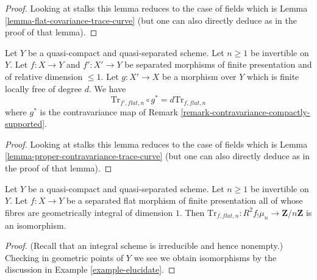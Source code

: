 \begin{proof}
Looking at stalks this lemma reduces to the case of fields
which is Lemma \ref{lemma-flat-covariance-trace-curve}
(but one can also directly deduce as in the proof of that lemma).
\end{proof}

\begin{lemma}
\label{lemma-proper-contravariance-trace-relative-curve}
Let $Y$ be a quasi-compact and quasi-separated scheme.
Let $n \geq 1$ be invertible on $Y$. Let $f : X \to Y$
and $f' : X' \to Y$ be separated morphisms of finite presentation
and of relative dimension $\leq 1$. Let $g : X' \to X$ be
a morphism over $Y$ which is finite locally free of degree $d$.
We have
$$
\text{Tr}_{f', \mathit{flat}, n} \circ g^* =
d \text{Tr}_{f, \mathit{flat}, n}
$$
where $g^*$ is the contravariance map of
Remark \ref{remark-contravariance-compactly-supported}.
\end{lemma}

\begin{proof}
Looking at stalks this lemma reduces to the case of fields
which is Lemma \ref{lemma-proper-contravariance-trace-curve}
(but one can also directly deduce as in the proof of that lemma).
\end{proof}

\begin{lemma}
\label{lemma-trace-iso-relative-curve}
Let $Y$ be a quasi-compact and quasi-separated scheme.
Let $n \geq 1$ be invertible on $Y$. Let $f : X \to Y$
be a separated flat morphism of finite presentation all
of whose fibres are geometrically integral of dimension $1$.
Then
$\text{Tr}_{f, \mathit{flat}, n} : R^2f_!\mu_n \to \mathbf{Z}/n\mathbf{Z}$
is an isomorphism.
\end{lemma}

\begin{proof}
(Recall that an integral scheme is irreducible and hence nonempty.)
Checking in geometric points of $Y$ we see we obtain isomorphisms
by the discussion in Example \ref{example-elucidate}.
\end{proof}

